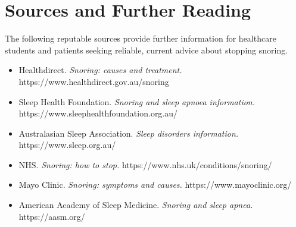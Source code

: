\section*{Sources and Further Reading}
The following reputable sources provide further information for healthcare students and patients seeking reliable, current advice about stopping snoring.

\begin{itemize}
    \item Healthdirect. \textit{Snoring: causes and treatment.} https://www.healthdirect.gov.au/snoring
    \item Sleep Health Foundation. \textit{Snoring and sleep apnoea information.} https://www.sleephealthfoundation.org.au/
    \item Australasian Sleep Association. \textit{Sleep disorders information.} https://www.sleep.org.au/
    \item NHS. \textit{Snoring: how to stop.} https://www.nhs.uk/conditions/snoring/
    \item Mayo Clinic. \textit{Snoring: symptoms and causes.} https://www.mayoclinic.org/
    \item American Academy of Sleep Medicine. \textit{Snoring and sleep apnea.} https://aasm.org/
\end{itemize}
